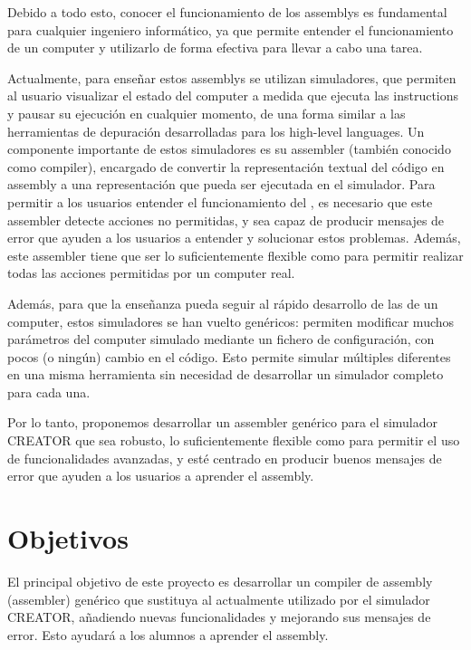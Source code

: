 Debido a todo esto, conocer el funcionamiento de los \glspl{assembly} es
fundamental para cualquier ingeniero informático, ya que permite entender el
funcionamiento de un \gls{computer} y utilizarlo de forma efectiva para llevar a
cabo una tarea.

Actualmente, para enseñar estos \glspl{assembly} se utilizan simuladores, que
permiten al usuario visualizar el estado del \gls{computer} a medida que ejecuta
las \glspl{instruction} y pausar su ejecución en cualquier momento, de una forma
similar a las herramientas de depuración desarrolladas para los
\glspl{high-level language}. Un componente importante de estos simuladores es su
\gls{assembler} (también conocido como \gls{compiler}), encargado de convertir
la representación textual del código en \gls{assembly} a una representación que
pueda ser ejecutada en el simulador. Para permitir a los usuarios entender el
funcionamiento del , es necesario que
este \gls{assembler} detecte acciones no permitidas, y sea capaz de producir
mensajes de error que ayuden a los usuarios a entender y solucionar estos
problemas. Además, este \gls{assembler} tiene que ser lo suficientemente
flexible como para permitir realizar todas las acciones permitidas por un
\gls{computer} real.

Además, para que la enseñanza pueda seguir al rápido desarrollo de las
 de un \gls{computer}, estos simuladores se han
vuelto genéricos: permiten modificar muchos parámetros del \gls{computer}
simulado mediante un fichero de configuración, con pocos (o ningún) cambio en el
código. Esto permite simular múltiples  diferentes
en una misma herramienta sin necesidad de desarrollar un simulador completo para
cada una.


Por lo tanto, proponemos desarrollar un \gls{assembler} genérico para el simulador
CREATOR que sea robusto, lo suficientemente flexible como para permitir el uso
de funcionalidades avanzadas, y esté centrado en producir buenos mensajes de
error que ayuden a los usuarios a aprender el \gls{assembly}.

\section{Objetivos}\label{sec:objectives}

El principal objetivo de este proyecto es desarrollar un \gls{compiler} de
\gls{assembly} (\gls{assembler}) genérico que sustituya al actualmente utilizado
por el simulador CREATOR, añadiendo nuevas funcionalidades y mejorando sus
mensajes de error. Esto ayudará a los alumnos a aprender el \gls{assembly}.

